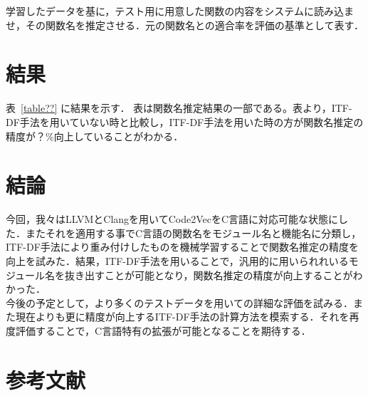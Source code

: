 \documentclass[submit]{ipsj}
\begin{document}
学習したデータを基に，テスト用に用意した関数の内容をシステムに読み込ませ，その関数名を推定させる．元の関数名との適合率を評価の基準として表す．





\section{結果}
表~\ref{table??} に結果を示す．
表は関数名推定結果の一部である。表より，ITF-DF手法を用いていない時と比較し，ITF-DF手法を用いた時の方が関数名推定の精度が？\%向上していることがわかる．

\section{結論}
今回，我々はLLVMとClangを用いてCode2VecをC言語に対応可能な状態にした．またそれを適用する事でC言語の関数名をモジュール名と機能名に分類し，ITF-DF手法により重み付けしたものを機械学習することで関数名推定の精度を向上を試みた．結果，ITF-DF手法を用いることで，汎用的に用いられれいるモジュール名を抜き出すことが可能となり，関数名推定の精度が向上することがわかった．\\
今後の予定として，より多くのテストデータを用いての詳細な評価を試みる．また現在よりも更に精度が向上するITF-DF手法の計算方法を模索する．それを再度評価することで，C言語特有の拡張が可能となることを期待する．



\section{参考文献}






\end{document}
